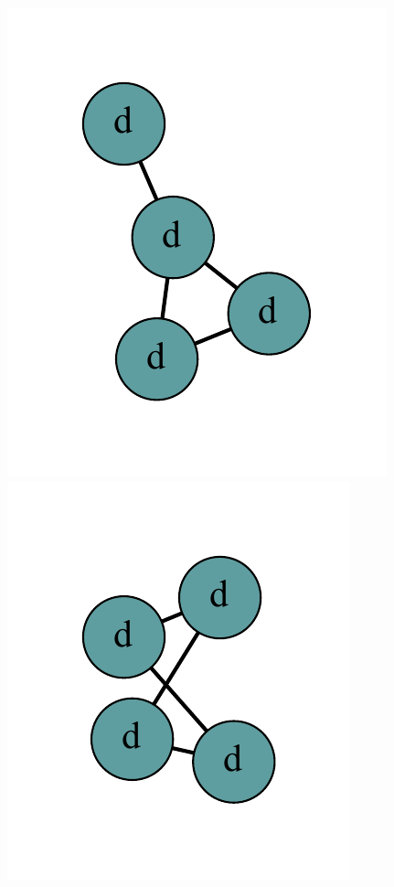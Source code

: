 \documentclass[12pt]{article}
\theoremstyle{plain}
\theoremstyle{definition}
\theoremstyle{remark}
\begin{document}
\begin{figure}[htb]
			\includegraphics[scale=0.5]{Superabundance/all/011011[2,1,2,3].pdf}
			\includegraphics[scale=0.5]{Superabundance/all/011110[2,2,2,2].pdf}

\end{figure}
\end{document}
